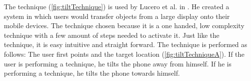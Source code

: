 \begin{figure}[H]
	\label{fig:throwTechnique}
\end{figure}

The \tilt technique (\cref{fig:tiltTechnique}) is used by Lucero et al. in .
He created a system in which users would transfer objects from a large display onto their mobile devices.
The \throw technique chosen because it is a one handed, low complexity technique with a few amount of steps needed to activate it. 
Just like the \swipe technique, it is easy intuitive and straight forward. 
The \tilt technique is performed as follows:
The user first points and the target location (\cref{fig:tiltTechniqueA}).
If the user is performing a \push technique, he tilts the phone away from himself.
If he is performing a \pull technique, he tilts the phone towards himself. 


